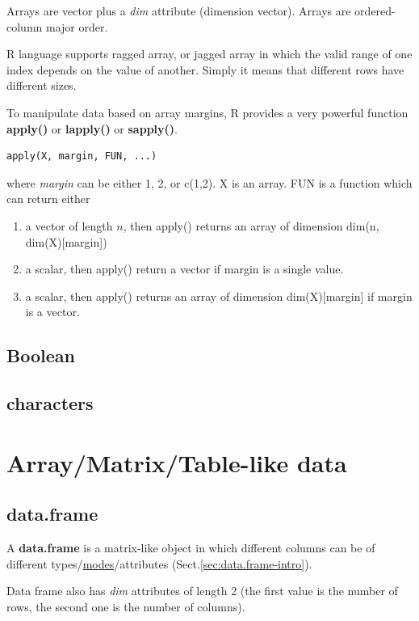 Arrays are vector plus a {\it dim} attribute (dimension vector).  
Arrays are ordered-column major order.

R language supports ragged array, or jagged array in which the valid
range of one index depends on the value of another. Simply it means
that different rows have different sizes.

To manipulate data based on array margins, R provides a very powerful
function {\bf apply()} or {\bf lapply()} or {\bf sapply()}.
\begin{lstlisting}
apply(X, margin, FUN, ...)
\end{lstlisting}
where {\it margin} can be either 1, 2, or c(1,2). X is an array.
FUN is a function which can return either
\begin{enumerate}
\item a vector of length $n$, then apply() returns an array of
  dimension dim(n, dim(X)[margin])
\item a scalar, then apply() return a vector if margin is a single
  value.

\item a scalar, then apply() returns an array of dimension
  dim(X)[margin] if margin is a vector.
\end{enumerate}



\section{Boolean}
\label{sec:boolean}

\section{characters}
\label{sec:characters}


\chapter{Array/Matrix/Table-like data}


\section{data.frame}
\label{sec:data.frame}

A {\bf data.frame} is a matrix-like object in which different columns can be of
different types/\hyperref[mode]{modes}/attributes
(Sect.\ref{sec:data.frame-intro}).


Data frame also has {\it dim} attributes of length 2 (the first value is the
number of rows, the second one is the number of columns).


